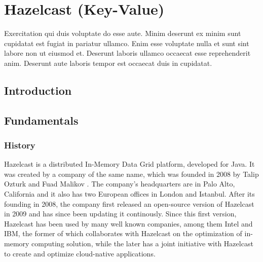 
\chapter{Hazelcast (Key-Value)} \label{ch:hazelcast}

Exercitation qui duis voluptate do esse aute. Minim deserunt ex minim sunt cupidatat est fugiat in pariatur ullamco. Enim esse voluptate nulla et sunt sint labore non ut eiusmod et. Deserunt laboris ullamco occaecat esse reprehenderit anim. Deserunt aute laboris tempor est occaecat duis in cupidatat.

\section{Introduction} \label{sec:introductionHazelcast}

\section{Fundamentals} \label{sec:fundamentalsHazelcast}
\subsection{History} \label{subsec:historyHazelcast}
Hazelcast is a distributed In-Memory Data Grid platform, developed for Java. It was created by a company of the same name, 
which was founded in 2008 by Talip Ozturk and Fuad Malikov \parencite{DatabaseofDatabases.11032023}. The company's headquarters are 
in Palo Alto, California and it also has two European offices in London and Istanbul\parencite{HazelcastContact.03112022}. \newline
After its founding in 2008, the company first released an open-source version of Hazelcast in 2009 and has since been updating it 
continously\parencite{DatabaseofDatabases.11032023}. Since this first version, Hazelcast has been used by many well known companies, 
among them Intel and IBM, the former of which collaborates with Hazelcast on the optimization of in-memory computing solution, while 
the later has a joint initiative with Hazelcast to create and optimize cloud-native applications\parencite{HazelcastPartners.270122}.
